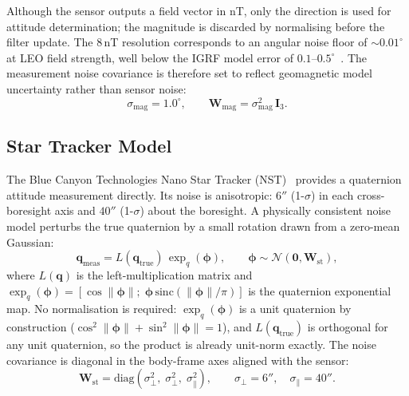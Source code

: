 Although the sensor outputs a field vector in nT, only the direction is used
for attitude determination; the magnitude is discarded by normalising before
the filter update.  The 8\,nT resolution corresponds to an angular noise floor
of $\sim\!0.01^\circ$ at LEO field strength, well below the IGRF model error
of $0.1$--$0.5^\circ$~\cite{IGRF}.  The measurement noise covariance is
therefore set to reflect geomagnetic model uncertainty rather than sensor
noise:
\begin{equation}
  \sigma_\mathrm{mag} = 1.0^\circ, \qquad
  \mathbf{W}_\mathrm{mag} = \sigma_\mathrm{mag}^2\,\mathbf{I}_3.
\end{equation}
\subsection{Star Tracker Model}
\label{sec:star_tracker}

The Blue Canyon Technologies Nano Star Tracker (NST)~\cite{BCT_NST} provides a
quaternion attitude measurement directly.  Its noise is anisotropic: $6''$
(1-$\sigma$) in each cross-boresight axis and $40''$ (1-$\sigma$) about the
boresight.  A physically consistent noise model perturbs the true quaternion by a
small rotation drawn from a zero-mean Gaussian:
\begin{equation}
  \mathbf{q}_\mathrm{meas}
  = L(\mathbf{q}_\mathrm{true})\,
    \exp_q\!\left(\boldsymbol{\phi}\right),
  \qquad
  \boldsymbol{\phi} \sim \mathcal{N}(\mathbf{0}, \mathbf{W}_\mathrm{st}),
\end{equation}
where $L(\mathbf{q})$ is the left-multiplication matrix and
$\exp_q(\boldsymbol{\phi}) = [\cos\|\boldsymbol{\phi}\|;\;
\boldsymbol{\phi}\,\mathrm{sinc}(\|\boldsymbol{\phi}\|/\pi)]$
is the quaternion exponential map.  No normalisation is required:
$\exp_q(\boldsymbol{\phi})$ is a unit quaternion by construction
($\cos^2\!\|\boldsymbol{\phi}\| + \sin^2\!\|\boldsymbol{\phi}\| = 1$), and
$L(\mathbf{q}_\mathrm{true})$ is orthogonal for any unit quaternion, so the
product is already unit-norm exactly.  The noise covariance is diagonal in the
body-frame axes aligned with the sensor:
\begin{equation}
  \mathbf{W}_\mathrm{st}
  = \mathrm{diag}\!\left(
    \sigma_\perp^2,\; \sigma_\perp^2,\; \sigma_\parallel^2
  \right),
  \qquad
  \sigma_\perp = 6'',\quad
  \sigma_\parallel = 40''.
\end{equation}


